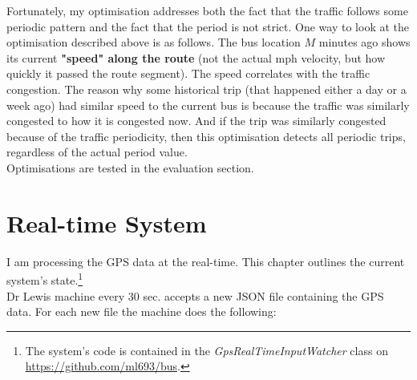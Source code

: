 \documentclass[12pt,a4paper,oneside,openright]{report}
\begin{document}
Fortunately, my optimisation addresses both the fact that the traffic follows some
periodic pattern and the fact that the period is not strict. One way to look at
the optimisation described above is as follows. The bus location $M$ minutes ago shows
its current \textbf{"speed" along the route} (not the actual mph velocity, but how
quickly it passed the route segment). The speed correlates with the traffic
congestion. The reason why some historical trip (that happened either a day or a week
ago) had similar speed to the current bus is because the traffic was similarly
congested to how it is congested now. And if the trip was similarly congested because
of the traffic periodicity, then this optimisation detects all periodic trips, regardless
of the actual period value. \\

Optimisations are tested in the evaluation section.


\newpage

\section{Real-time System}

I am processing the GPS data at the real-time. This chapter outlines the current
system's state.\footnote{The system's code is contained in the \textit{GpsRealTimeInputWatcher} class 
on \textcolor{blue}{\url{https://github.com/ml693/bus}}.} \\

Dr Lewis machine every 30 sec. accepts a new JSON file containing the GPS data. For each new
file the machine does the following:
\end{document}
